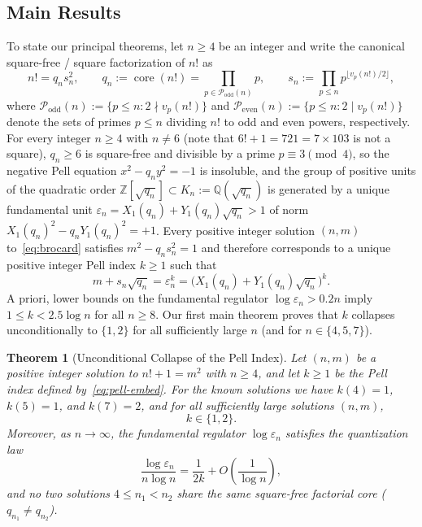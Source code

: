 \documentclass[11pt,reqno]{amsart}
\newtheorem{theorem}{Theorem}[section]
\theoremstyle{remark}
\newcommand{\Z}{\mathbb{Z}}
\newcommand{\Q}{\mathbb{Q}}
\newcommand{\Podd}{\mathcal{P}_{\mathrm{odd}}}
\newcommand{\Peven}{\mathcal{P}_{\mathrm{even}}}
\newcommand{\core}{\operatorname{core}}
\begin{document}
\subsection{Main Results}
To state our principal theorems, let $n \ge 4$ be an integer and write the canonical square-free / square factorization of $n!$ as
\begin{equation}\label{eq:fact-decomp}
n! = q_n s_n^2, \qquad q_n := \core(n!) = \prod_{p \in \Podd(n)} p, \qquad s_n := \prod_{p \le n} p^{\lfloor v_p(n!)/2 \rfloor},
\end{equation}
where $\Podd(n) := \{p \le n : 2 \nmid v_p(n!)\}$ and $\Peven(n) := \{p \le n : 2 \mid v_p(n!)\}$ denote the sets of primes $p \le n$ dividing $n!$ to odd and even powers, respectively. For every integer $n \ge 4$ with $n \ne 6$ (note that $6! + 1 = 721 = 7 \times 103$ is not a square), $q_n \ge 6$ is square-free and divisible by a prime $p \equiv 3 \pmod 4$, so the negative Pell equation $x^2 - q_n y^2 = -1$ is insoluble, and the group of positive units of the quadratic order $\Z[\sqrt{q_n}] \subset K_n := \Q(\sqrt{q_n})$ is generated by a unique fundamental unit $\varepsilon_n = X_1(q_n) + Y_1(q_n)\sqrt{q_n} > 1$ of norm $X_1(q_n)^2 - q_n Y_1(q_n)^2 = +1$. Every positive integer solution $(n, m)$ to~\eqref{eq:brocard} satisfies $m^2 - q_n s_n^2 = 1$ and therefore corresponds to a unique positive integer Pell index $k \ge 1$ such that
\begin{equation}\label{eq:pell-embed}
m + s_n\sqrt{q_n} = \varepsilon_n^k = \bigl(X_1(q_n) + Y_1(q_n)\sqrt{q_n}\bigr)^k.
\end{equation}
A priori, lower bounds on the fundamental regulator $\log \varepsilon_n > 0.2 n$ imply $1 \le k < 2.5 \log n$ for all $n \ge 8$. Our first main theorem proves that $k$ collapses unconditionally to $\{1, 2\}$ for all sufficiently large $n$ (and for $n \in \{4, 5, 7\}$).

\begin{theorem}[Unconditional Collapse of the Pell Index]\label{thm:1.1}
Let $(n, m)$ be a positive integer solution to $n! + 1 = m^2$ with $n \ge 4$, and let $k \ge 1$ be the Pell index defined by~\eqref{eq:pell-embed}. For the known solutions we have $k(4) = 1$, $k(5) = 1$, and $k(7) = 2$, and for all sufficiently large solutions $(n, m)$,
\begin{equation}\label{eq:k12}
k \in \{1, 2\}.
\end{equation}
Moreover, as $n \to \infty$, the fundamental regulator $\log \varepsilon_n$ satisfies the quantization law
\begin{equation}\label{eq:quant}
\frac{\log \varepsilon_n}{n \log n} = \frac{1}{2k} + O\!\left(\frac{1}{\log n}\right),
\end{equation}
and no two solutions $4 \le n_1 < n_2$ share the same square-free factorial core ($q_{n_1} \ne q_{n_2}$).
\end{theorem}
\end{document}
